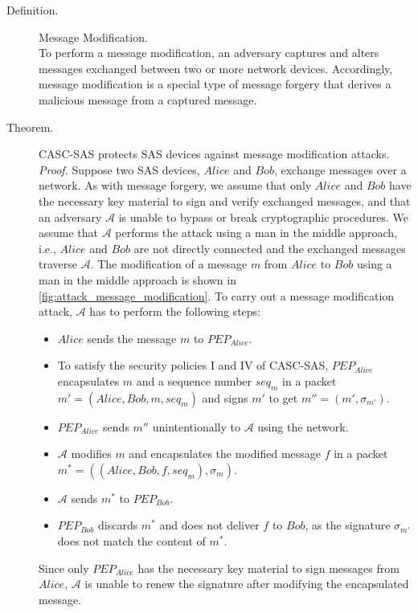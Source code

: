 \begin{description}
    \item[Definition.] Message Modification.\\
    To perform a message modification, an adversary captures and alters messages exchanged between two or more network devices.
    Accordingly, message modification is a special type of message forgery that derives a malicious message from a captured message.

    \item[Theorem.] CASC-SAS protects SAS devices against message modification attacks.\\
    \textit{Proof.} Suppose two SAS devices, $Alice$ and $Bob$, exchange messages over a network.
    As with message forgery, we assume that only $Alice$ and $Bob$ have the necessary key material to sign and verify exchanged messages, and that an adversary $\mathcal{A}$ is unable to bypass or break cryptographic procedures.
    We assume that $\mathcal{A}$ performs the attack using a man in the middle approach, i.e., $Alice$ and $Bob$ are not directly connected and the exchanged messages traverse $\mathcal{A}$.
    The modification of a message $m$ from $Alice$ to $Bob$ using a man in the middle approach is shown in \autoref{fig:attack_message_modification}.
    To carry out a message modification attack, $\mathcal{A}$ has to perform the following steps:
    \begin{itemize}
        \item $Alice$ sends the message $m$ to $PEP_{Alice}$.
        \item To satisfy the security policies I and IV of CASC-SAS, $PEP_{Alice}$ encapsulates $m$ and a sequence number $seq_m$ in a packet $m' = (Alice, Bob, m, seq_m)$ and signs $m'$ to get $m'' = (m', \sigma_{m'})$.
        \item $PEP_{Alice}$ sends $m''$ unintentionally to $\mathcal{A}$ using the network.
        \item $\mathcal{A}$ modifies $m$ and encapsulates the modified message $f$ in a packet $m^* = ((Alice, Bob, f, seq_{m}), \sigma_{m})$.
        \item $\mathcal{A}$ sends $m^*$ to $PEP_{Bob}$.
        \item $PEP_{Bob}$ discards $m^*$ and does not deliver $f$ to $Bob$, as the signature $\sigma_{m'}$ does not match the content of $m^*$.
    \end{itemize}
    Since only $PEP_{Alice}$ has the necessary key material to sign messages from $Alice$, $\mathcal{A}$ is unable to renew the signature after modifying the encapsulated message.

\end{description}
